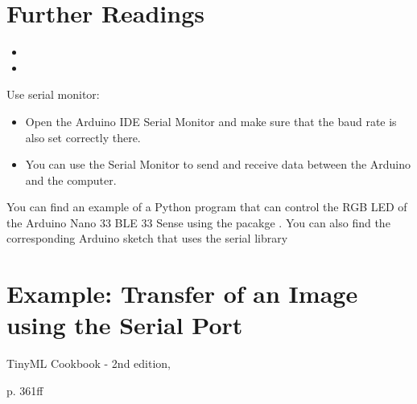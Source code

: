 \section{Further Readings}

\begin{itemize}
    \item 
{}

  \item {}
\end{itemize}


\bigskip

Use serial monitor:

\begin{itemize}
  \item Open the Arduino IDE Serial Monitor and make sure that the baud rate is also set correctly there.
  \item You can use the Serial Monitor to send and receive data between the Arduino and the computer.
\end{itemize}



You can find an example of a Python program that can control the RGB LED of the Arduino Nano 33 BLE 33 Sense using the pacakge  . You can also find the corresponding Arduino sketch that uses the serial library 


\section{Example: Transfer of an Image using the Serial Port}

TinyML Cookbook - 2nd edition, \cite{Iodice:2023}

p. 361ff



